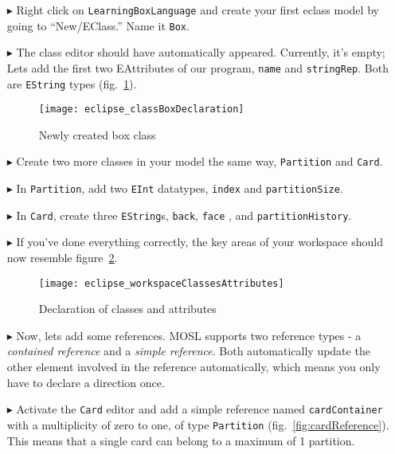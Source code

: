 \begin{itemize}
\item[$\blacktriangleright$] Right click on \texttt{LearningBoxLanguage} and create your first eclass model by going to ``New/EClass.'' Name it \texttt{Box}.

\item[$\blacktriangleright$] The class editor should have automatically appeared. Currently, it's empty; Lets add the first two EAttributes of our program, \texttt{name} and \texttt{stringRep}. Both are \texttt{EString} types (fig.~\ref{fig:boxDeclaration}).

\begin{figure}[htbp]
	\centering
  \texttt{[image: eclipse\_classBoxDeclaration]}
	\caption{Newly created box class}
	\label{fig:boxDeclaration}
\end{figure} 

\item[$\blacktriangleright$] Create two more classes in your model the same way, \texttt{Partition} and \texttt{Card}. 

\item[$\blacktriangleright$] In \texttt{Partition}, add two \texttt{EInt} datatypes, \texttt{index} and \texttt{partitionSize}. 

\item[$\blacktriangleright$] In \texttt{Card}, create three \texttt{EString}s, \texttt{back}, \texttt{face} , and \texttt{partitionHistory}.

\item[$\blacktriangleright$] If you've done everything correctly, the key areas of your workspace should now resemble figure~\ref{fig:workspaceClassAttributes}.

\begin{figure}[htbp]
	\centering
  \texttt{[image: eclipse\_workspaceClassesAttributes]}
	\caption{Declaration of classes and attributes}
	\label{fig:workspaceClassAttributes}
\end{figure} 

\item[$\blacktriangleright$] Now, lets add some references. MOSL supports two reference types - a \emph{contained reference} and a \emph{simple reference}. Both automatically update the other element involved in the reference automatically, which means you only have to declare a direction once.

\item[$\blacktriangleright$] Activate the \texttt{Card} editor and add a simple reference named \texttt{cardContainer} with a multiplicity of zero to one, of type \texttt{Partition} (fig.~\ref{fig:cardReference}). This means that a single card can belong to a maximum of 1 partition.


\end{itemize}
